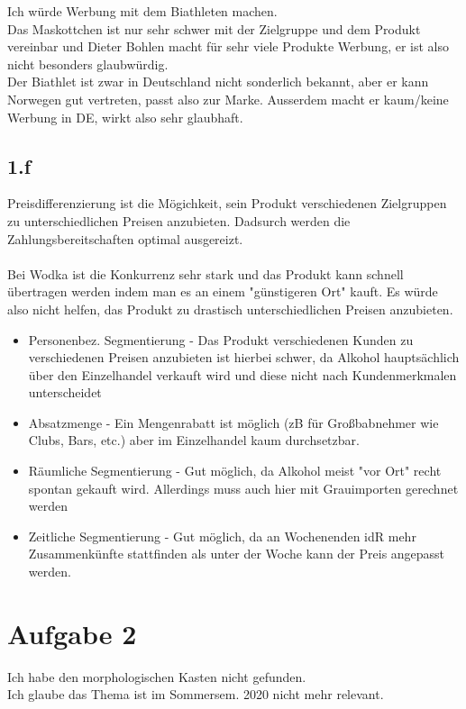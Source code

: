 Ich würde Werbung mit dem Biathleten machen. \\
Das Maskottchen ist nur sehr schwer mit der Zielgruppe und dem Produkt vereinbar und Dieter Bohlen macht für sehr viele Produkte Werbung, er ist also nicht besonders glaubwürdig. \\
Der Biathlet ist zwar in Deutschland nicht sonderlich bekannt, aber er kann Norwegen gut vertreten, passt also zur Marke. Ausserdem macht er kaum/keine Werbung in DE, wirkt also sehr glaubhaft. 

\subsection{1.f}
Preisdifferenzierung ist die Mögichkeit, sein Produkt verschiedenen Zielgruppen zu unterschiedlichen Preisen anzubieten. Dadsurch werden die Zahlungsbereitschaften optimal ausgereizt. \\
\\
Bei Wodka ist die Konkurrenz sehr stark und das Produkt kann schnell übertragen werden indem man es an einem "günstigeren Ort" kauft. Es würde also nicht helfen, das Produkt zu drastisch unterschiedlichen Preisen anzubieten. \\
\begin{itemize}
    \item Personenbez. Segmentierung - Das Produkt verschiedenen Kunden zu verschiedenen Preisen anzubieten ist hierbei schwer, da Alkohol hauptsächlich über den Einzelhandel verkauft wird und diese nicht nach Kundenmerkmalen unterscheidet
    \item Absatzmenge - Ein Mengenrabatt ist möglich (zB für Großbabnehmer wie Clubs, Bars, etc.) aber im Einzelhandel kaum durchsetzbar.
    \item Räumliche Segmentierung - Gut möglich, da Alkohol meist "vor Ort" recht spontan gekauft wird. Allerdings muss auch hier mit Grauimporten gerechnet werden
    \item Zeitliche Segmentierung - Gut möglich, da an Wochenenden idR mehr Zusammenkünfte stattfinden als unter der Woche kann der Preis angepasst werden.
\end{itemize}

\section{Aufgabe 2}
Ich habe den morphologischen Kasten nicht gefunden. \\
Ich glaube das Thema ist im Sommersem. 2020 nicht mehr relevant.
